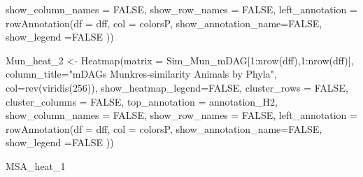 \documentclass[
  letterpaper,
  DIV=11,
  numbers=noendperiod]{scrreprt}
\newenvironment{Shaded}{}{}
\newcommand{\AttributeTok}[1]{\textcolor[rgb]{0.78,0.47,0.87}{#1}}
\newcommand{\ConstantTok}[1]{\textcolor[rgb]{0.82,0.60,0.40}{#1}}
\newcommand{\DecValTok}[1]{\textcolor[rgb]{0.82,0.60,0.40}{#1}}
\newcommand{\FunctionTok}[1]{\textcolor[rgb]{0.38,0.69,0.94}{#1}}
\newcommand{\NormalTok}[1]{\textcolor[rgb]{0.67,0.70,0.75}{#1}}
\newcommand{\OtherTok}[1]{\textcolor[rgb]{0.15,0.68,0.38}{#1}}
\newcommand{\SpecialCharTok}[1]{\textcolor[rgb]{0.34,0.71,0.76}{#1}}
\newcommand{\StringTok}[1]{\textcolor[rgb]{0.60,0.76,0.47}{#1}}
\begin{document}
\begin{Shaded}
\begin{Highlighting}[]
                      \AttributeTok{show\_column\_names =} \ConstantTok{FALSE}\NormalTok{, }
                      \AttributeTok{show\_row\_names =} \ConstantTok{FALSE}\NormalTok{,}
                      \AttributeTok{left\_annotation =} 
                        \FunctionTok{rowAnnotation}\NormalTok{(}\AttributeTok{df =}\NormalTok{ dff,}
                                      \AttributeTok{col =}\NormalTok{ colorsP,}
                                      \AttributeTok{show\_annotation\_name=}\ConstantTok{FALSE}\NormalTok{,}
                                      \AttributeTok{show\_legend =}\ConstantTok{FALSE}
\NormalTok{                                      ))}



\NormalTok{Mun\_heat\_2 }\OtherTok{\textless{}{-}} \FunctionTok{Heatmap}\NormalTok{(}\AttributeTok{matrix =}\NormalTok{ Sim\_Mun\_mDAG[}\DecValTok{1}\SpecialCharTok{:}\FunctionTok{nrow}\NormalTok{(dff),}\DecValTok{1}\SpecialCharTok{:}\FunctionTok{nrow}\NormalTok{(dff)], }
              \AttributeTok{column\_title=}\StringTok{"mDAGs Munkres{-}similarity  Animals by Phyla"}\NormalTok{,}
        \AttributeTok{col=}\FunctionTok{rev}\NormalTok{(}\FunctionTok{viridis}\NormalTok{(}\DecValTok{256}\NormalTok{)),}
    \AttributeTok{show\_heatmap\_legend=}\ConstantTok{FALSE}\NormalTok{, }
        \AttributeTok{cluster\_rows =} \ConstantTok{FALSE}\NormalTok{,}
        \AttributeTok{cluster\_columns =} \ConstantTok{FALSE}\NormalTok{,}
        \AttributeTok{top\_annotation =}\NormalTok{ annotation\_H2,}
        \AttributeTok{show\_column\_names =} \ConstantTok{FALSE}\NormalTok{, }
        \AttributeTok{show\_row\_names =} \ConstantTok{FALSE}\NormalTok{,}
        \AttributeTok{left\_annotation =} \FunctionTok{rowAnnotation}\NormalTok{(}\AttributeTok{df =}\NormalTok{ dff,}
                                        \AttributeTok{col =}\NormalTok{ colorsP,}
                                    \AttributeTok{show\_annotation\_name=}\ConstantTok{FALSE}\NormalTok{,}
                                        \AttributeTok{show\_legend =}\ConstantTok{FALSE}
\NormalTok{                                        ))}
\end{Highlighting}
\end{Shaded}

\begin{Shaded}
\begin{Highlighting}[]
\NormalTok{MSA\_heat\_1}
\end{Highlighting}
\end{Shaded}
\end{document}
